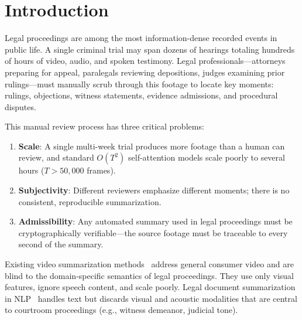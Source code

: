\documentclass[letterpaper]{article} %
\begin{document}
\section{Introduction}

Legal proceedings are among the most information-dense recorded events in public life. A single criminal trial may span dozens of hearings totaling hundreds of hours of video, audio, and spoken testimony. Legal professionals---attorneys preparing for appeal, paralegals reviewing depositions, judges examining prior rulings---must manually scrub through this footage to locate key moments: rulings, objections, witness statements, evidence admissions, and procedural disputes.

This manual review process has three critical problems:
\begin{enumerate}
    \item \textbf{Scale}: A single multi-week trial produces more footage than a human can review, and standard $O(T^2)$ self-attention models scale poorly to several hours ($T > 50,000$ frames).
    \item \textbf{Subjectivity}: Different reviewers emphasize different moments; there is no consistent, reproducible summarization.
    \item \textbf{Admissibility}: Any automated summary used in legal proceedings must be cryptographically verifiable---the source footage must be traceable to every second of the summary.
\end{enumerate}

Existing video summarization methods~\cite{zhou2018deep,mahasseni2017unsupervised,fajtl2019summarizing} address general consumer video and are blind to the domain-specific semantics of legal proceedings. They use only visual features, ignore speech content, and scale poorly. Legal document summarization in NLP~\cite{liu2023legal,zhong2019extractive} handles text but discards visual and acoustic modalities that are central to courtroom proceedings (e.g., witness demeanor, judicial tone).
\end{document}
